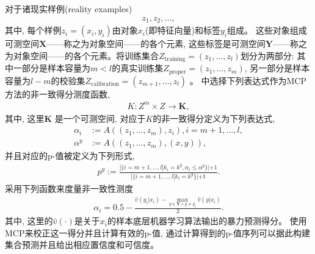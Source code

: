 对于诸现实样例(reality examples)
\begin{align}
z_{1}, z_{2}, \ldots,
\end{align}
其中, 每个样例$z_{i} = (x_{i}, y_{i})$由对象$x_{i}$(即特征向量)和标签$y_{i}$组成。 这些对象组成可测空间$\mathbf{X}$——称之为对象空间——的各个元素, 这些标签是可测空间$\mathbf{Y}$——称之为对象空间——的各个元素。将训练集合$Z_{\text{training}} = (z_{1},\ldots,z_{l})$划分为两部分: 其中一部分是样本容量为$m < l$的真实训练集$Z_{\text{proper}} = (z_{1},\ldots,z_{m})$, 另一部分是样本容量为$l-m$的校验集$Z_{\text{calibration}} = (z_{m+1},\ldots,z_{l})$ \citep{shafer08a}。 中选择下列表达式作为MCP方法的非一致得分测度函数, 
\begin{align}
K : Z^{m} \times Z \rightarrow \mathbf{K},
\end{align}
其中, 这里$\mathbf{K}$ 是一个可测空间, 对应于$K$的非一致得分定义为下列表达式, 
\begin{align}
\alpha_{i} &:= A((z_{1}, \ldots, z_{m}), z_{i}), i = m+1, \ldots, l,\\
\alpha^{y} &:= A((z_{1}, \ldots, z_{m}), (x, y)),
\end{align}
并且对应的p-值被定义为下列形式,
\begin{align}
\label{p-value}
p^{y} := \frac{|\{i = m + 1, \ldots, l | k_{i} = k^{y},  \alpha_{i} \leq \alpha^{y}\}| + 1}{|\{i = m + 1, \ldots, l | k_{i} = k^{y}\}| + 1}.
\end{align}
采用下列函数来度量非一致性测度
\begin{align}
\label{margin}
\alpha_{i} = 0.5 - \frac{\hat{v}(y_{i} | x_{i}) - \max_{y \in \mathbf{Y} \wedge y \neq y_{i}}^{}\hat{v}(y|x_{i})}{2}.
\end{align}
其中, 这里的$\hat{v}(\cdot)$是关于$x_{i}$的样本底层机器学习算法输出的暴力预测得分。 使用MCP来校正这一得分并且计算有效的p-值, 通过计算得到的p-值序列可以据此构建集合预测并且给出相应置信度和可信度。 

